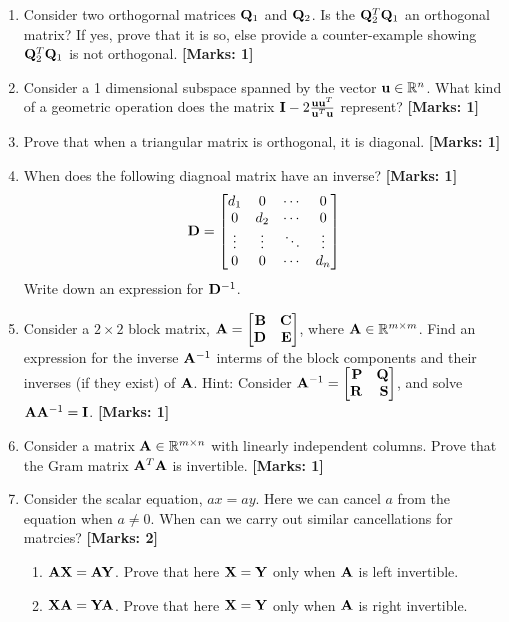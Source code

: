\documentclass[12pt]{article}
\def\mf{\ensuremath\mathbf}
\def\mb{\ensuremath\mathbb}
\def\bmx{\ensuremath\begin{bmatrix*}[r]}
\def\emx{\ensuremath\end{bmatrix*}}
\begin{document}
\begin{enumerate}
  \item Consider two orthogornal matrices $\mf{Q}_1$ and $\mf{Q}_2$. Is the $\mf{Q}_2^T\mf{Q}_1$ an orthogonal matrix? If yes, prove that it is so, else provide a counter-example showing $\mf{Q}_2^T\mf{Q}_1$ is not orthogonal. \textbf{[Marks: 1]}

  \item Consider a 1 dimensional subspace spanned by the vector $\mf{u} \in \mb{R}^n$. What kind of a geometric operation does the matrix $\mf{I} - 2\frac{\mf{u}\mf{u}^T}{\mf{u}^T\mf{u}}$ represent? \textbf{[Marks: 1]}

  \item Prove that when a triangular matrix is orthogonal, it is diagonal. \textbf{[Marks: 1]}

  \item When does the following diagnoal matrix have an inverse? \textbf{[Marks: 1]}
  \[ \mf{D} = \begin{bmatrix*}
  d_1 & 0 & \cdots & 0\\
  0 & d_2 & \cdots & 0\\
  \vdots & \vdots & \ddots & \vdots\\
  0 & 0 & \cdots & d_n\\\end{bmatrix*} \]
  Write down an expression for $\mf{D}^{-1}$.
  
  \item Consider a $2 \times 2$ block matrix, $\mf{A} = \bmx \mf{B} & \mf{C}\\\mf{D} & \mf{E}\emx$, where $\mf{A} \in \mb{R}^{m \times m}$. Find an expression for the inverse $\mf{A}^{-1}$ interms of the block components and their inverses (if they exist) of $\mf{A}$. Hint: Consider $\mf{A}^{-1} = \bmx \mf{P} & \mf{Q}\\ \mf{R} & \mf{S}\emx$, and solve $\mf{A}\mf{A}^{-1} = \mf{I}$. \textbf{[Marks: 1]}

  \item Consider a matrix $\mf{A} \in \mathbb{R}^{m \times n}$ with linearly independent columns. Prove that the Gram matrix $\mf{A}^T\mf{A}$ is invertible. \textbf{[Marks: 1]}

  \item Consider the scalar equation, $ax = ay$. Here we can cancel $a$ from the equation when $a \neq 0$. When can we carry out similar cancellations for matrcies? \textbf{[Marks: 2]}
  \begin{enumerate}
      \item $\mf{A}\mf{X} = \mf{A}\mf{Y}$. Prove that here $\mf{X}=\mf{Y}$ only when $\mf{A}$ is left invertible.
      \item $\mf{X}\mf{A} = \mf{Y}\mf{A}$. Prove that here $\mf{X}=\mf{Y}$ only when $\mf{A}$ is right invertible.
  \end{enumerate}


\end{enumerate}
\end{document}
